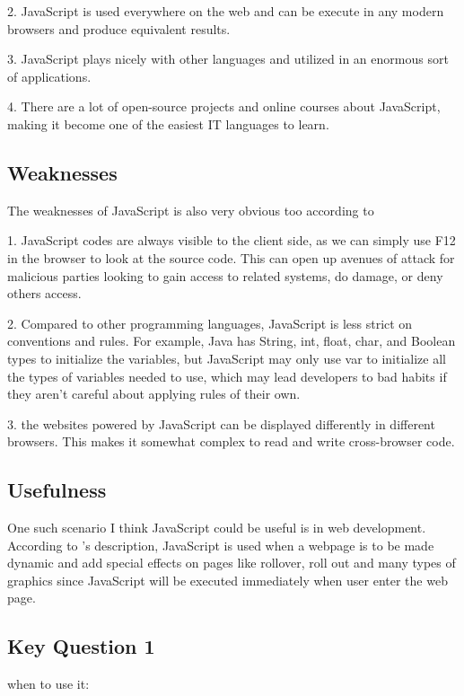 \documentclass[a4paper, 11pt]{report}
\begin{document}
2. JavaScript is used everywhere on the web and can be execute in any modern browsers and produce equivalent results.

3. JavaScript plays nicely with other languages and utilized in an enormous sort of applications. 

4. There are a lot of open-source projects and online courses about JavaScript, making it become one of the easiest IT languages to learn.

\subsection{Weaknesses}
The weaknesses of JavaScript is also very obvious too according to \cite{geeksforgeeks-2023B}  

1. JavaScript codes are always visible to the client side, as we can simply use F12 in the browser to look at the source code. This can open up avenues of attack for malicious parties looking to gain access to related systems, do damage, or deny others access.

2. Compared to other programming languages, JavaScript is less strict on conventions and rules. For example, Java has String, int, float, char, and Boolean types to initialize the variables, but JavaScript may only use var to initialize all the types of variables needed to use, which may lead developers to bad habits if they aren't careful about applying rules of their own.

3. the websites powered by JavaScript can be displayed differently in different browsers. This makes it somewhat complex to read and write cross-browser code.

\subsection{Usefulness}
One such scenario I think JavaScript could be useful is in web development. According to \cite{pedamkar-2023}'s description, JavaScript is used when a webpage is to be made dynamic and add special effects on pages like rollover, roll out and many types of graphics since JavaScript will be executed immediately when user enter the web page.

\subsection{Key Question 1}
when to use it:
\end{document}
